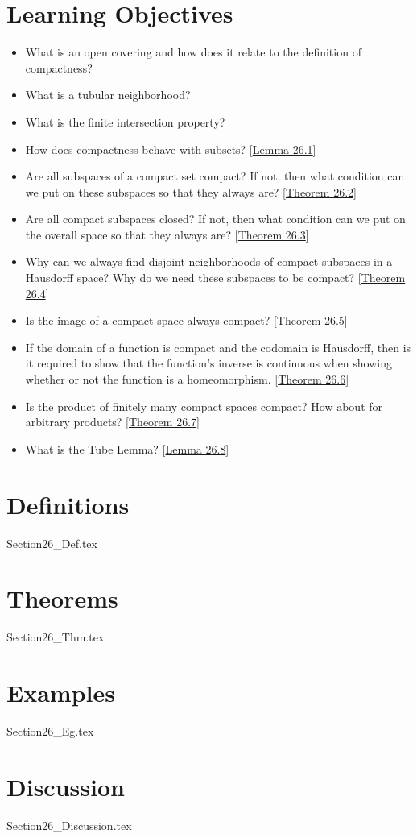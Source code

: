 \section{Learning Objectives}

\begin{itemize}
    \item What is an open covering and how does it relate to the definition
        of compactness?
    \item What is a tubular neighborhood?
    \item What is the finite intersection property?
    \item How does compactness behave with subsets? 
        [\hyperlink{lem:26.1}{Lemma 26.1}]
    \item Are all subspaces of a compact set compact? If not, then what 
        condition can we put on these subspaces so that they always are?
        [\hyperlink{thm:26.2}{Theorem 26.2}]
    \item Are all compact subspaces closed? If not, then what condition can
        we put on the overall space so that they always are?
        [\hyperlink{thm:26.3}{Theorem 26.3}]
    \item Why can we always find disjoint neighborhoods of compact subspaces
        in a Hausdorff space? Why do we need these subspaces to be compact?
        [\hyperlink{thm:26.4}{Theorem 26.4}]
    \item Is the image of a compact space always compact?
        [\hyperlink{thm:26.5}{Theorem 26.5}]
    \item If the domain of a function is compact and the codomain is Hausdorff,
        then is it required to show that the function's inverse is continuous
        when showing whether or not the function is a homeomorphism.
        [\hyperlink{thm:26.6}{Theorem 26.6}]
    \item Is the product of finitely many compact spaces compact?
        How about for arbitrary products?
        [\hyperlink{thm:26.7}{Theorem 26.7}]
    \item What is the Tube Lemma? [\hyperlink{lem:26.8}{Lemma 26.8}]
\end{itemize}

\section{Definitions}

{Section26_Def.tex}

\section{Theorems}

{Section26_Thm.tex}

\section{Examples}

{Section26_Eg.tex}

\section{Discussion}

{Section26_Discussion.tex}